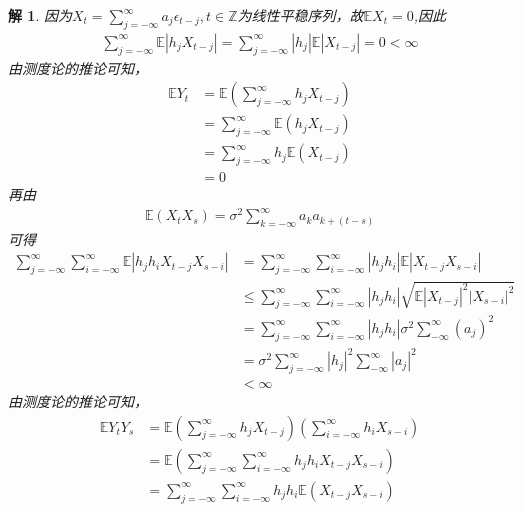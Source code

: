 \documentclass[11pt,a4paper]{ctexart}
\newtheorem*{solution}{解}
\begin{document}
\begin{enumerate}
\begin{solution}
因为$X_t=\sum^{\infty}_{j=-\infty}a_j\epsilon_{t-j},t\in\mathbb{Z}$为线性平稳序列，故$\mathbb{E}X_t=0$,因此
\begin{equation}
\begin{aligned}
\sum^{\infty}_{j=-\infty}\mathbb{E}|h_jX_{t-j}|=\sum^{\infty}_{j=-\infty}|h_j|\mathbb{E}|X_{t-j}|=0<\infty
\end{aligned}
\end{equation}
由测度论的推论可知，
\begin{equation}
\begin{aligned}
\mathbb{E}Y_t &= \mathbb{E}(\sum_{j=-\infty}^{\infty}h_jX_{t-j}) \\
&= \sum_{j=-\infty}^{\infty}\mathbb{E}(h_jX_{t-j})\\
&= \sum_{j=-\infty}^{\infty}h_j\mathbb{E}(X_{t-j})\\
&= 0
\end{aligned}
\end{equation}
再由
\begin{equation}
\begin{aligned}
\mathbb{E}(X_tX_s)=\sigma^2\sum_{k=-\infty}^{\infty}a_ka_{k+(t-s)}
\end{aligned}
\end{equation}
可得
\begin{equation}
\begin{aligned}
\sum_{j=-\infty}^{\infty}\sum_{i=-\infty}^{\infty}\mathbb{E}|h_jh_iX_{t-j}X_{s-i}|
&=\sum_{j=-\infty}^{\infty}\sum_{i=-\infty}^{\infty}|h_jh_i|\mathbb{E}|X_{t-j}X_{s-i}|\\
&\leq\sum_{j=-\infty}^{\infty}\sum_{i=-\infty}^{\infty}|h_jh_i|
\sqrt{\mathbb{E}|X_{t-j}|^2|X_{s-i}|^2}\\
&= \sum_{j=-\infty}^{\infty}\sum_{i=-\infty}^{\infty}|h_jh_i|
\sigma^2\sum_{-\infty}^{\infty}(a_j)^2\\
&= \sigma^2\sum_{j=-\infty}^{\infty}|h_j|^2\sum_{-\infty}^{\infty}|a_j|^2\\
&< \infty
\end{aligned}
\end{equation}
由测度论的推论可知，
\begin{equation}
\begin{aligned}
\mathbb{E}Y_tY_s &= \mathbb{E}
(\sum_{j=-\infty}^{\infty}h_jX_{t-j})(\sum_{i=-\infty}^{\infty}h_iX_{s-i}) \\
&= \mathbb{E}(\sum_{j=-\infty}^{\infty}\sum_{i=-\infty}^{\infty}h_jh_iX_{t-j}X_{s-i})\\
&= \sum_{j=-\infty}^{\infty}\sum_{i=-\infty}^{\infty}h_jh_i\mathbb{E}(X_{t-j}X_{s-i})\\

\end{aligned}
\end{equation}
\end{solution}
\end{enumerate}
\end{document}
